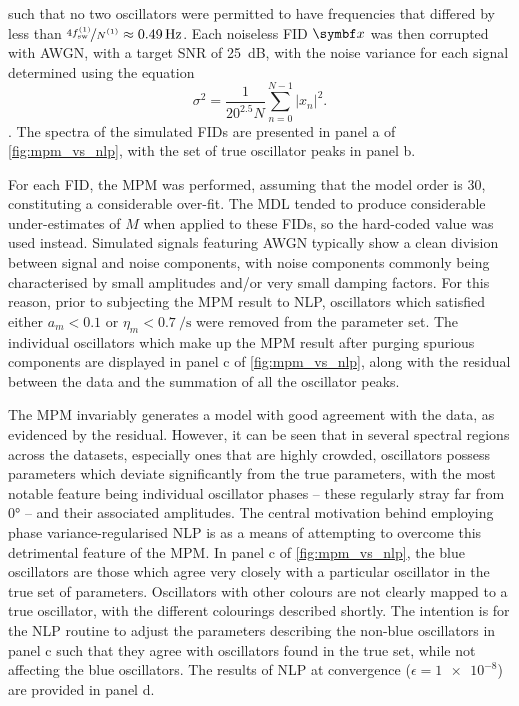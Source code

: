 such that no two oscillators were permitted to have frequencies that differed
by less than $\nicefrac{4 \fswone}{\None} \approx \qty{0.49}{\hertz}$. Each
noiseless \ac{FID} $\bx$ was then corrupted with \ac{AWGN}, with a target
\ac{SNR} of \qty{25}{\deci\bel}, with the noise variance for each signal
determined using the equation
\begin{equation}
    \sigma^2 = \frac{1}{20^{2.5} N}
        \sum_{n=0}^{N-1} \lvert x_n \rvert^2.
\end{equation}
.
The spectra of the simulated
\acp{FID} are presented in panel a of \cref{fig:mpm_vs_nlp}, with the set
of true oscillator peaks in panel b.

For each \ac{FID}, the \ac{MPM} was performed, assuming that the model order is
30, constituting a considerable over-fit. The \ac{MDL} tended to produce
considerable under-estimates of $M$ when applied to these \acp{FID}, so the
hard-coded value was used instead. Simulated signals featuring \ac{AWGN}
typically show a clean division between signal and noise components, with noise
components commonly being characterised by small amplitudes and/or very small
damping factors. For this reason, prior to subjecting the \ac{MPM} result to
\ac{NLP}, oscillators which satisfied either $a_m < 0.1$ or  $\eta_m <
\qty{0.7}{\per\second}$ were removed from the parameter set. The individual
oscillators which make up the \ac{MPM} result after purging spurious components
are displayed in panel c of \cref{fig:mpm_vs_nlp}, along with the
residual between the data and the summation of all the oscillator peaks.

The \ac{MPM} invariably generates a model with good agreement with the data, as
evidenced by the residual.
However, it can be seen that in several spectral regions across the datasets,
especially ones that are highly crowded, oscillators possess parameters which
deviate significantly from the true parameters, with the most notable feature
being individual oscillator phases -- these regularly stray far from \ang{0} --
and their associated amplitudes. The central motivation behind employing phase
variance-regularised \ac{NLP} is as a means of attempting to overcome this
detrimental feature of the \ac{MPM}.
In panel c of \cref{fig:mpm_vs_nlp}, the blue oscillators are those which
agree very closely with a particular oscillator in the true set of parameters.
Oscillators with other colours are not clearly mapped to a true oscillator,
with the different colourings described shortly.
The intention is for the \ac{NLP} routine to adjust the parameters describing
the non-blue oscillators in panel c such that they agree with oscillators found
in the true set, while not affecting the blue oscillators.
The results of \ac{NLP} at convergence ($\epsilon = \num{1e-8}$) are provided
in panel d.

